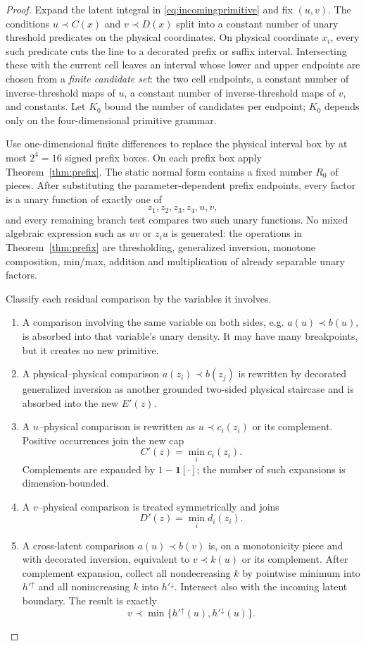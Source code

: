 \documentclass[12pt,a4paper]{article}
\theoremstyle{definition}
\newcommand{\1}{\mathbf 1}
\begin{document}
\begin{proof}
Expand the latent integral in \eqref{eq:incomingprimitive} and fix $(u,v)$.  The conditions $u\prec C(x)$ and $v\prec D(x)$ split into a constant number of unary threshold predicates on the physical coordinates.  On physical coordinate $x_i$, every such predicate cuts the line to a decorated prefix or suffix interval.  Intersecting these with the current cell leaves an interval whose lower and upper endpoints are chosen from a \emph{finite candidate set}: the two cell endpoints, a constant number of inverse-threshold maps of $u$, a constant number of inverse-threshold maps of $v$, and constants.  Let $K_0$ bound the number of candidates per endpoint; $K_0$ depends only on the four-dimensional primitive grammar.

Use one-dimensional finite differences to replace the physical interval box by at most $2^4=16$ signed prefix boxes.  On each prefix box apply Theorem~\ref{thm:prefix}.  The static normal form contains a fixed number $R_0$ of pieces.  After substituting the parameter-dependent prefix endpoints, every factor is a unary function of exactly one of
\[
z_1,z_2,z_3,z_4,u,v,
\]
and every remaining branch test compares two such unary functions.  No mixed algebraic expression such as $uv$ or $z_i u$ is generated: the operations in Theorem~\ref{thm:prefix} are thresholding, generalized inversion, monotone composition, min/max, addition and multiplication of already separable unary factors.

Classify each residual comparison by the variables it involves.
\begin{enumerate}[label=(\roman*),leftmargin=2em]
\item A comparison involving the same variable on both sides, e.g. $a(u)\prec b(u)$, is absorbed into that variable's unary density.  It may have many breakpoints, but it creates no new primitive.
\item A physical--physical comparison $a(z_i)\prec b(z_j)$ is rewritten by decorated generalized inversion as another grounded two-sided physical staircase and is absorbed into the new $E'(z)$.
\item A $u$--physical comparison is rewritten as $u\prec c_i(z_i)$ or its complement.  Positive occurrences join the new cap
\[
C'(z)=\min_i c_i(z_i).
\]
Complements are expanded by $1-\1[\cdot]$; the number of such expansions is dimension-bounded.
\item A $v$--physical comparison is treated symmetrically and joins
\[
D'(z)=\min_i d_i(z_i).
\]
\item A cross-latent comparison $a(u)\prec b(v)$ is, on a monotonicity piece and with decorated inversion, equivalent to $v\prec k(u)$ or its complement.  After complement expansion, collect all nondecreasing $k$ by pointwise minimum into $h'^{\uparrow}$ and all nonincreasing $k$ into $h'^{\downarrow}$.  Intersect also with the incoming latent boundary.  The result is exactly
\[
v\prec\min\{h'^{\uparrow}(u),h'^{\downarrow}(u)\}.
\]
\end{enumerate}


\end{proof}
\end{document}
